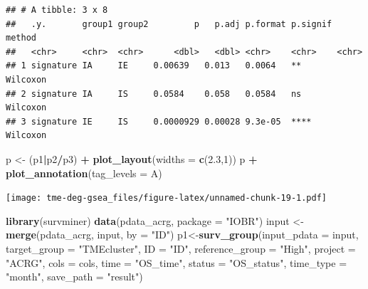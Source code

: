 \documentclass[
  12pt,
]{book}
\newenvironment{Shaded}{\begin{snugshade}}{\end{snugshade}}
\newcommand{\AttributeTok}[1]{\textcolor[rgb]{0.13,0.29,0.53}{#1}}
\newcommand{\DecValTok}[1]{\textcolor[rgb]{0.00,0.00,0.81}{#1}}
\newcommand{\FloatTok}[1]{\textcolor[rgb]{0.00,0.00,0.81}{#1}}
\newcommand{\FunctionTok}[1]{\textcolor[rgb]{0.13,0.29,0.53}{\textbf{#1}}}
\newcommand{\NormalTok}[1]{#1}
\newcommand{\OtherTok}[1]{\textcolor[rgb]{0.56,0.35,0.01}{#1}}
\newcommand{\SpecialCharTok}[1]{\textcolor[rgb]{0.81,0.36,0.00}{\textbf{#1}}}
\newcommand{\StringTok}[1]{\textcolor[rgb]{0.31,0.60,0.02}{#1}}
\begin{document}
\begin{verbatim}
## # A tibble: 3 x 8
##   .y.       group1 group2         p   p.adj p.format p.signif method  
##   <chr>     <chr>  <chr>      <dbl>   <dbl> <chr>    <chr>    <chr>   
## 1 signature IA     IE     0.00639   0.013   0.0064   **       Wilcoxon
## 2 signature IA     IS     0.0584    0.058   0.0584   ns       Wilcoxon
## 3 signature IE     IS     0.0000929 0.00028 9.3e-05  ****     Wilcoxon
\end{verbatim}

\begin{Shaded}
\begin{Highlighting}[]
\NormalTok{p }\OtherTok{\textless{}{-}}\NormalTok{ (p1}\SpecialCharTok{|}\NormalTok{p2}\SpecialCharTok{/}\NormalTok{p3) }\SpecialCharTok{+} \FunctionTok{plot\_layout}\NormalTok{(}\AttributeTok{widths =} \FunctionTok{c}\NormalTok{(}\FloatTok{2.3}\NormalTok{,}\DecValTok{1}\NormalTok{))}
\NormalTok{p }\SpecialCharTok{+} \FunctionTok{plot\_annotation}\NormalTok{(}\AttributeTok{tag\_levels =} \StringTok{\textquotesingle{}A\textquotesingle{}}\NormalTok{)}
\end{Highlighting}
\end{Shaded}

\texttt{[image: tme-deg-gsea\_files/figure-latex/unnamed-chunk-19-1.pdf]}

\begin{Shaded}
\begin{Highlighting}[]
\FunctionTok{library}\NormalTok{(survminer)}
\FunctionTok{data}\NormalTok{(pdata\_acrg, }\AttributeTok{package =} \StringTok{"IOBR"}\NormalTok{)}
\NormalTok{input }\OtherTok{\textless{}{-}} \FunctionTok{merge}\NormalTok{(pdata\_acrg, input, }\AttributeTok{by =} \StringTok{"ID"}\NormalTok{)}
\NormalTok{p1}\OtherTok{\textless{}{-}}\FunctionTok{surv\_group}\NormalTok{(}\AttributeTok{input\_pdata       =}\NormalTok{ input,}
               \AttributeTok{target\_group      =} \StringTok{"TMEcluster"}\NormalTok{,}
               \AttributeTok{ID                =} \StringTok{"ID"}\NormalTok{,}
               \AttributeTok{reference\_group   =} \StringTok{"High"}\NormalTok{,}
               \AttributeTok{project           =} \StringTok{"ACRG"}\NormalTok{,}
               \AttributeTok{cols              =}\NormalTok{ cols, }
               \AttributeTok{time              =} \StringTok{"OS\_time"}\NormalTok{,}
               \AttributeTok{status            =} \StringTok{"OS\_status"}\NormalTok{,}
               \AttributeTok{time\_type         =} \StringTok{"month"}\NormalTok{,}
               \AttributeTok{save\_path         =} \StringTok{"result"}\NormalTok{)}
\end{Highlighting}
\end{Shaded}
\end{document}
